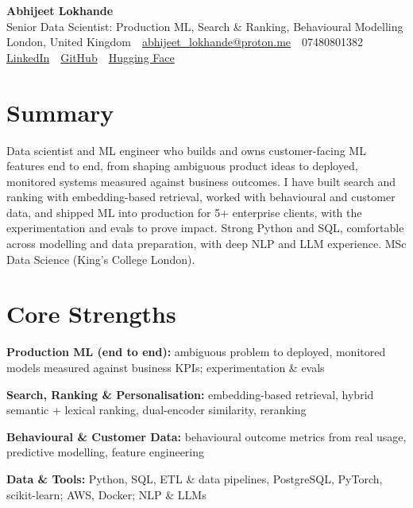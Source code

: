\documentclass[10pt,a4paper]{article}
\newcommand{\sep}{\,\textcolor{accent!60}{\textbar}\,}
\begin{document}
\begin{center}
  {\fontsize{24}{26}\selectfont\bfseries Abhijeet Lokhande}\\[3pt]
  {\color{accent}\large Senior Data Scientist: Production ML, Search \& Ranking, Behavioural Modelling}\\[5pt]
  {\small
    London, United Kingdom \sep
    \href{mailto:abhijeet_lokhande@proton.me}{abhijeet\_lokhande@proton.me} \sep
    07480801382 \\[2pt]
    \href{https://www.linkedin.com/in/ablds/}{LinkedIn} \sep
    \href{https://github.com/abhijeetscode}{GitHub} \sep
    \href{https://huggingface.co/ab-ai}{Hugging Face}
  }
\end{center}
\vspace{2pt}

\section{Summary}
Data scientist and ML engineer who builds and owns customer-facing ML features end to end, from shaping ambiguous product ideas to deployed, monitored systems measured against business outcomes. I have built search and ranking with embedding-based retrieval, worked with behavioural and customer data, and shipped ML into production for 5+ enterprise clients, with the experimentation and evals to prove impact. Strong Python and SQL, comfortable across modelling and data preparation, with deep NLP and LLM experience. MSc Data Science (King's College London).

\section{Core Strengths}
\begin{tight}
  \item[\textcolor{accent}{\small$\bullet$}] \textbf{Production ML (end to end):} ambiguous problem to deployed, monitored models measured against business KPIs; experimentation \& evals
  \item[\textcolor{accent}{\small$\bullet$}] \textbf{Search, Ranking \& Personalisation:} embedding-based retrieval, hybrid semantic + lexical ranking, dual-encoder similarity, reranking
  \item[\textcolor{accent}{\small$\bullet$}] \textbf{Behavioural \& Customer Data:} behavioural outcome metrics from real usage, predictive modelling, feature engineering
  \item[\textcolor{accent}{\small$\bullet$}] \textbf{Data \& Tools:} Python, SQL, ETL \& data pipelines, PostgreSQL, PyTorch, scikit-learn; AWS, Docker; NLP \& LLMs
\end{tight}
\end{document}
